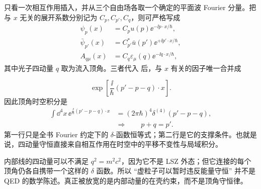\begin{derivation}[局域电磁顶角中的动量守恒]
只看一次相互作用插入，并从三个自由场各取一个确定的平面波 Fourier 分量。把与 $x$ 无关的展开系数分别记为 $C_p,C_{p'},C_q$，则可严格写成
\begin{align*}
 \psi_p(x)&=C_pu(p)\ee^{-\ii p\cdot x/\hbar},\\
 \bar\psi_{p'}(x)&=C_{p'}^*\bar u(p')\ee^{+\ii p'\cdot x/\hbar},\\
 A_{q\mu}(x)&=C_q\varepsilon_\mu(q)\ee^{-\ii q\cdot x/\hbar},
\end{align*}
其中光子四动量 $q$ 取为流入顶角。三者代入 后，与 $x$ 有关的因子唯一合并成

\begin{equation*}
 \exp\!\left[
 \frac{\ii}{\hbar}(p'-p-q)\cdot x
 \right].
\end{equation*}
因此顶角时空积分是
\begin{align*}
 \int\dd^4 x\,
 \ee^{\frac{\ii}{\hbar}(p'-p-q)\cdot x}
 &=(2\pi\hbar)^4
 \delta^{(4)}(p'-p-q),\\
 &\Longrightarrow\qquad p+q=p'.
 \end{align*}
第一行只是全书 Fourier 约定下的 $\delta$-函数恒等式；第二行是它的支撑条件。也就是说，四动量守恒直接来自相互作用在时空中的平移不变性与局域积分。

内部线的四动量可以不满足 $q^2=m^2c^2$，因为它不是 LSZ 外态；但它连接的每个顶角仍各自携带一个这样的 \(\delta\) 函数。所以 ``虚粒子可以暂时违反能量守恒'' 并不是 QED 的数学陈述。真正被放宽的是内部动量的在壳约束，而不是顶角守恒律。
\end{derivation}

